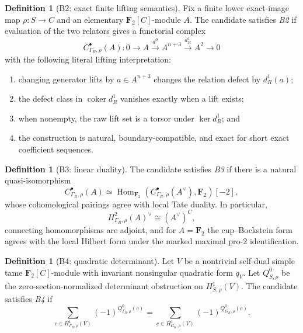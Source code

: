 \documentclass[11pt,reqno]{amsart}
\theoremstyle{definition}
\newtheorem{definition}[theorem]{Definition}
\theoremstyle{remark}
\numberwithin{equation}{section}
\newcommand{\F}{\mathbf F}
\newcommand{\Hom}{\operatorname{Hom}}
\newcommand{\coker}{\operatorname{coker}}
\begin{document}
\begin{definition}[B2: exact finite lifting semantics]\label{def:B2}
Fix a finite lower exact-image map \(\rho:S\to C\) and an elementary
\(\F_2[C]\)-module \(A\).  The candidate satisfies \emph{B2} if
evaluation of the two relators gives a functorial complex
\begin{equation}\label{eq:fox-complex}
 C^\bullet_{\Gamma_R,\rho}(A):
 0\longrightarrow A\xrightarrow{d^0}A^{n+3}
  \xrightarrow{d_R^1}A^2\longrightarrow0
\end{equation}
with the following literal lifting interpretation:
\begin{enumerate}
\item changing generator lifts by \(a\in A^{n+3}\) changes the relation
defect by \(d_R^1(a)\);
\item the defect class in \(\coker d_R^1\) vanishes exactly when a lift
exists;
\item when nonempty, the raw lift set is a torsor under
\(\ker d_R^1\); and
\item the construction is natural, boundary-compatible, and exact for
short exact coefficient sequences.
\end{enumerate}
\end{definition}

\begin{definition}[B3: linear duality]\label{def:B3}
The candidate satisfies \emph{B3} if there is a natural
quasi-isomorphism
\begin{equation}\label{eq:duality-qiso}
 C^\bullet_{\Gamma_R,\rho}(A)\simeq
 \Hom_{\F_2}\!\left(
 C^\bullet_{\Gamma_R,\rho}(A^\vee),\F_2\right)[-2],
\end{equation}
whose cohomological pairings agree with local Tate duality.  In
particular,
\[
 H^2_{\Gamma_R,\rho}(A)^\vee\cong(A^\vee)^C,
\]
connecting homomorphisms are adjoint, and for \(A=\F_2\) the
cup--Bockstein form agrees with the local Hilbert form under the marked
maximal pro-\(2\) identification.
\end{definition}

\begin{definition}[B4: quadratic determinant]\label{def:B4}
Let \(V\) be a nontrivial self-dual simple tame
\(\F_2[C]\)-module with invariant nonsingular quadratic form \(q_V\).
Let \(Q^0_{S,\rho}\) be the zero-section-normalized determinant
obstruction on \(H^1_{S,\rho}(V)\).  The candidate satisfies \emph{B4}
if
\begin{equation}\label{eq:B4}
 \sum_{c\in H^1_{\Gamma_R,\rho}(V)}
  (-1)^{Q^0_{\Gamma_R,\rho}(c)}
 =
 \sum_{c\in H^1_{G_K,\rho}(V)}
  (-1)^{Q^0_{G_K,\rho}(c)}.
\end{equation}
\end{definition}
\end{document}
